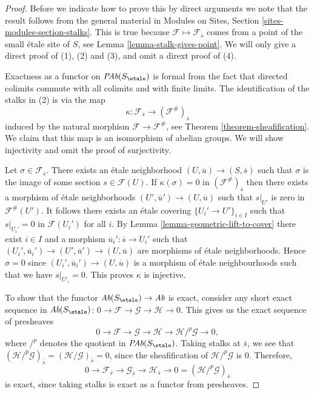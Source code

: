 \begin{proof}
Before we indicate how to prove this by direct arguments
we note that the result follows from the general material in
Modules on Sites, Section \ref{sites-modules-section-stalks}.
This is true because $\mathcal{F} \mapsto \mathcal{F}_{\overline{s}}$
comes from a point of the small \'etale site of $S$, see
Lemma \ref{lemma-stalk-gives-point}.
We will only give a direct proof of (1), (2) and (3), and omit
a dirext proof of (4).

\medskip\noindent
Exactness as a functor on $\textit{PAb}(S_\etale)$ is formal from the
fact that directed colimits commute with all colimits and with finite
limits. The identification of the stalks in (2) is via the map
$$
\kappa :
\mathcal{F}_{\overline{s}}
\longrightarrow
(\mathcal{F}^\#)_{\overline{s}}
$$
induced by the natural morphism $\mathcal{F}\to \mathcal{F}^\#$, see
Theorem \ref{theorem-sheafification}.
We claim that this map is an isomorphism of abelian groups. We will show
injectivity and omit the proof of surjectivity.

\medskip\noindent
Let $\sigma\in \mathcal{F}_{\overline{s}}$.
There exists an \'etale neighborhood
$(U, \overline{u})\to (S, \overline{s})$ such that $\sigma$ is the image of some
section $s \in \mathcal{F}(U)$. If $\kappa(\sigma) = 0$ in
$(\mathcal{F}^\#)_{\overline{s}}$ then there exists a morphism of \'etale
neighborhoods $(U', \overline{u}')\to (U, \overline{u})$ such that
$s|_{U'}$ is zero in $\mathcal{F}^\#(U')$. It follows there
exists an \'etale covering
$\{U_i'\to U'\}_{i\in I}$ such that $s|_{U_i'}=0$ in
$\mathcal{F}(U_i')$ for all $i$. By Lemma \ref{lemma-geometric-lift-to-cover}
there exist $i \in I$ and a morphism
$\overline{u}_i': \overline{s} \to U_i'$ such that
$(U_i', \overline{u}_i') \to (U', \overline{u}')\to (U, \overline{u})$
are morphisms of \'etale neighborhoods. Hence $\sigma = 0$
since $(U_i', \overline{u}_i') \to (U, \overline{u})$
is a morphism of \'etale neighbourhoods such that
we have $s|_{U'_i}=0$. This proves $\kappa$ is injective.

\medskip\noindent
To show that the functor $\textit{Ab}(S_\etale) \to \textit{Ab}$ is
exact, consider any short exact sequence in $\textit{Ab}(S_\etale)$:
$
0\to \mathcal{F}\to \mathcal{G}\to \mathcal H \to 0.
$
This gives us the exact sequence of presheaves
$$
0 \to \mathcal{F} \to \mathcal{G} \to \mathcal H \to
\mathcal H/^p\mathcal{G} \to 0,
$$
where $/^p$ denotes the quotient in $\textit{PAb}(S_\etale)$.
Taking stalks at
$\overline{s}$, we see that $(\mathcal H /^p\mathcal{G})_{\bar{s}} =
(\mathcal H /\mathcal{G})_{\bar{s}} = 0$, since the sheafification of
$\mathcal H/^p\mathcal{G}$ is $0$.
Therefore,
$$
0\to \mathcal{F}_{\overline{s}	} \to \mathcal{G}_{\overline{s}} \to
\mathcal{H}_{\overline{s}} \to 0 = (\mathcal H/^p\mathcal{G})_{\overline{s}}
$$
is exact, since taking stalks is exact as a functor from presheaves.
\end{proof}

